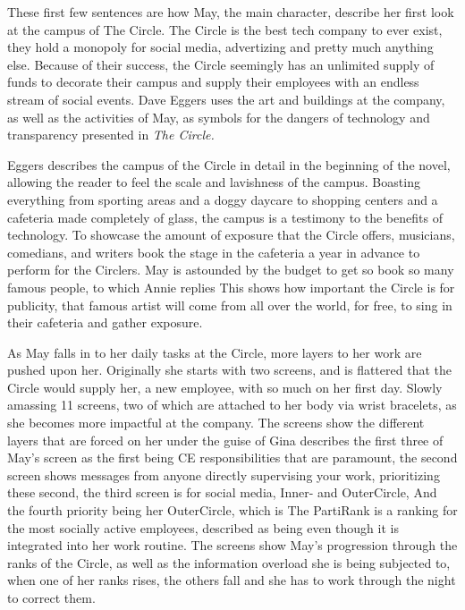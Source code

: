  \autocite[1]{eggers1} These first few sentences are how May, the main character, describe her first look at the campus of The Circle.
The Circle is the best tech company to ever exist, they hold a monopoly for social media, advertizing and pretty much anything else.
Because of their success, the Circle seemingly has an unlimited supply of funds to decorate their campus and supply their employees with an endless stream of social events.
Dave Eggers uses the art and buildings at the company, as well as the activities of May, as symbols for the dangers of technology and transparency presented in \textit{The Circle.}

Eggers describes the campus of the Circle in detail in the beginning of the novel, allowing the reader to feel the scale and lavishness of the campus.
Boasting everything from sporting areas and a doggy daycare to shopping centers and a cafeteria made completely of glass, the campus is a testimony to the benefits of technology.
To showcase the amount of exposure that the Circle offers, musicians, comedians, and writers book the stage in the cafeteria a year in advance to perform for the Circlers.
May is astounded by the budget to get so book so many famous people, to which Annie replies  \autocite[14]{eggers1}
This shows how important the Circle is for publicity, that famous artist will come from all over the world, for free, to sing in their cafeteria and gather exposure.

As May falls in to her daily tasks at the Circle, more layers to her work are pushed upon her.
Originally she starts with two screens, and is flattered that the Circle would supply her, a new employee, with so much on her first day.
Slowly amassing 11 screens, two of which are attached to her body via wrist bracelets, as she becomes more impactful at the company.
The screens show the different layers that are forced on her under the guise of 
Gina describes the first three of May's screen as the first being CE responsibilities that are paramount, the second screen shows messages from anyone directly supervising your work, prioritizing these second, the third screen is for social media, Inner- and OuterCircle,  \autocite[57]{eggers1} 
And the fourth priority being her OuterCircle, which is  \autocite[57]{eggers1}
The PartiRank is a ranking for the most socially active employees, described as being  \autocite[58]{eggers1} even though it is integrated into her work routine.
The screens show May's progression through the ranks of the Circle, as well as the information overload she is being subjected to, when one of her ranks rises, the others fall and she has to work through the night to correct them.

